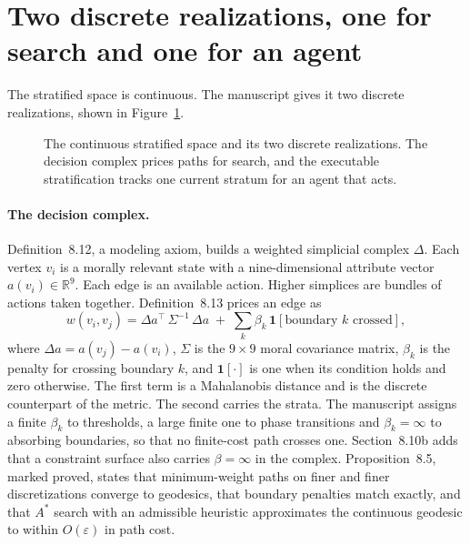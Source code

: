 \section{Two discrete realizations, one for search and one for an agent}\label{sec:ge-discrete}

The stratified space is continuous. The manuscript gives it two discrete realizations, shown in
Figure~\ref{fig:ge-discrete}.

\begin{figure}[t]
\centering

\caption{The continuous stratified space and its two discrete realizations. The decision complex
prices paths for search, and the executable stratification tracks one current stratum for an
agent that acts.}
\label{fig:ge-discrete}
\end{figure}

\paragraph{The decision complex.} Definition~8.12, a modeling axiom, builds a weighted simplicial
complex $\Delta$. Each vertex $v_i$ is a morally relevant state with a nine-dimensional attribute
vector $a(v_i)\in\mathbb{R}^9$. Each edge is an available action. Higher simplices are bundles of
actions taken together.
Definition~8.13 prices an edge as
\begin{equation}
w(v_i,v_j) = \Delta a^{\top}\,\Sigma^{-1}\,\Delta a \;+\; \sum_k \beta_k\,
\mathbf{1}[\text{boundary } k \text{ crossed}] ,
\label{eq:ge-edge}
\end{equation}
where $\Delta a = a(v_j)-a(v_i)$, $\Sigma$ is the $9\times9$ moral covariance matrix, $\beta_k$ is
the penalty for crossing boundary $k$, and $\mathbf{1}[\cdot]$ is one when its condition holds and
zero otherwise.
The first term is a Mahalanobis distance and is the discrete counterpart of the metric. The second
carries the strata. The manuscript assigns a finite $\beta_k$ to thresholds, a large finite one to
phase transitions and $\beta_k=\infty$ to absorbing boundaries, so that no finite-cost path crosses
one.
Section~8.10b adds that a constraint surface also carries $\beta=\infty$ in the complex.
Proposition~8.5, marked proved, states that minimum-weight paths on finer and finer
discretizations converge to geodesics, that boundary penalties match exactly, and that $A^*$
search with an admissible heuristic approximates the continuous geodesic to within $O(\varepsilon)$
in path cost.

